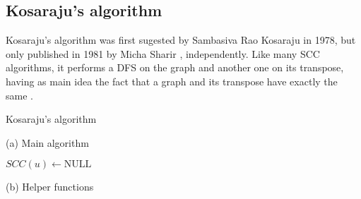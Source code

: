 \subsection{Kosaraju's algorithm} \label{algorithm-scc-kosaraju}
Kosaraju's algorithm was first sugested by Sambasiva Rao Kosaraju in 1978, but only published in 1981 by Micha Sharir \cite{sharir81}, independently. Like many \acrshort{SCC} algorithms, it performs a \acrshort{DFS} on the graph and another one on its transpose, having as main idea the fact that a graph and its transpose have exactly the same .
\begin{algorithm}
    \caption{Kosaraju's algorithm}
    \label{alg-kosaraju}
    \begin{minipage}[t]{0.49\textwidth}
        (a) Main algorithm
        \begin{algorithmic}[1]
             {$SCC(u) \gets \text{NULL}$}
            \EndFor
             {}
            \EndFor
             \label{alg:kosaraju-start-cycle}
                \State {}
            \EndWhile
            \State {}
            \EndFunction
        \end{algorithmic}
    \end{minipage}
    \begin{minipage}[t]{0.49\textwidth}
        (b) Helper functions
        \begin{algorithmic}[1]
                 {\Return{}}
                \EndIf
                 {}
                \EndFor
            \EndFunction

            
                 {\Return{}}
                \EndIf
                 {}
                \EndFor
            \EndFunction
        \end{algorithmic}
    \end{minipage}
\end{algorithm}
